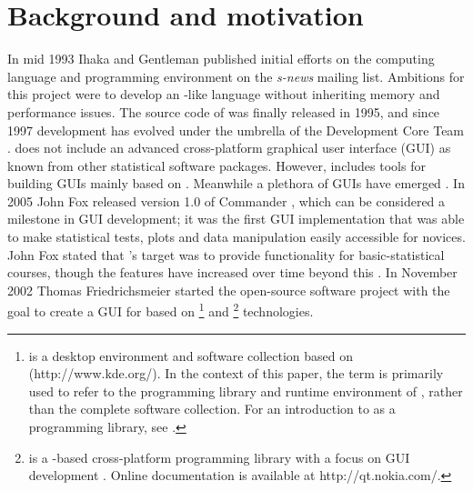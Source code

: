 \section{Background and motivation}
\label{background}
In mid 1993 Ihaka and Gentleman published initial efforts on the computing
language and programming environment  on the \emph{s-news} mailing list. Ambitions for
this project were to develop an -like language without inheriting memory
and performance issues. The source code of  was finally released in 1995, and 
since 1997 development has evolved under the umbrella of the  
Development Core Team \citep{RDCT2001, RDCT2010, Ihaka_Gentlemen_1993}.
 does not include an advanced cross-platform graphical user interface (GUI) as known from other
statistical software packages. However,  includes tools for building GUIs
mainly based on  \citep{Dalgaard2001, Dalgaard2002}. Meanwhile a
plethora of  GUIs have emerged \citep[see][for a comprehensive list]{RGUI}. In 2005 John Fox released version 1.0 of  Commander \citep[package ]{Fox2005}, which
can be considered a milestone in  GUI development; it was the first GUI
implementation that was able to make statistical tests,
plots and data manipulation easily accessible for  novices.
John Fox stated that 's target was to provide
functionality for basic-statistical courses, though the features have increased over
time beyond this \citep{Fox2005, Fox2007}. In November 2002 Thomas Friedrichsmeier
started the  open-source software project with the goal to create a GUI for
 based on \footnote{
   is a desktop environment and software collection based on  (http://www.kde.org/).
  In the context of this paper, the term  is primarily used to refer to the programming library and
  runtime environment of , rather than the complete software collection. For an introduction to
   as a programming library, see \cite{Faure2000}.
} and \footnote{
   is a -based cross-platform programming library with a focus on GUI development
  \citep{BlanchetteSummerfield2008}. Online documentation is available at http://qt.nokia.com/.
} technologies.

